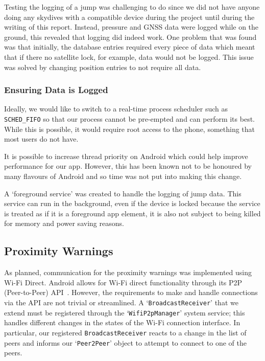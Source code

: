 Testing the logging of a jump was challenging to do since we did not have anyone doing any skydives with a compatible device during the project until during the writing of this report. Instead, pressure and GNSS data were logged while on the ground, this revealed that logging did indeed work. One problem that was found was that initially, the database entries required every piece of data which meant that if there no satellite lock, for example, data would not be logged. This issue was solved by changing position entries to not require all data.

\subsubsection{Ensuring Data is Logged}
Ideally, we would like to switch to a real-time process scheduler such as \texttt{SCHED\_FIFO} so that our process cannot be pre-empted and can perform its best. While this is possible, it would require root access to the phone, something that most users do not have.

It is possible to increase thread priority on Android which could help improve performance for our app. However, this has been known not to be honoured by many flavours of Android and so time was not put into making this change.

A `foreground service' was created to handle the logging of jump data. This service can run in the background, even if the device is locked because the service is treated as if it is a foreground app element, it is also not subject to being killed for memory and power saving reasons.

\subsection{Proximity Warnings}
As planned, communication for the proximity warnings was implemented using Wi-Fi Direct. Android allows for Wi-Fi direct functionality through its P2P (Peer-to-Peer) API~\cite{_creating_????}. However, the requirements to make and handle connections via the API are not trivial or streamlined. A `\texttt{BroadcastReceiver}' that we extend must be registered through the `\texttt{WifiP2pManager}' system service; this handles different changes in the states of the Wi-Fi connection interface. In particular, our registered \texttt{BroadcastReceiver} reacts to a change in the list of peers and informs our `\texttt{Peer2Peer}' object to attempt to connect to one of the peers.

